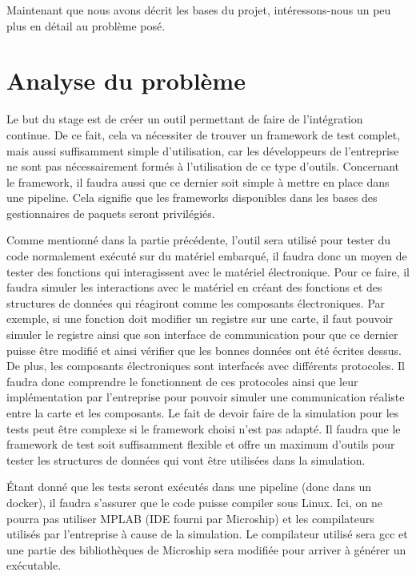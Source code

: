 \documentclass[a4paper]{article}
\begin{document}
Maintenant que nous avons décrit les bases du projet, intéressons-nous un peu
plus en détail au problème posé.
\section{Analyse du problème}%
\label{analproblem}

Le but du stage est de créer un outil permettant de faire de l'intégration
continue. De ce fait, cela va nécessiter de trouver un framework de test complet,
mais aussi suffisamment simple d'utilisation, car les développeurs de
l'entreprise ne sont pas nécessairement formés à l'utilisation de ce type
d'outils. Concernant le framework, il faudra aussi que ce dernier soit simple à
mettre en place dans une pipeline. Cela signifie que les frameworks disponibles
dans les bases des gestionnaires de paquets seront privilégiés.

Comme mentionné dans la partie précédente, l'outil sera utilisé pour tester du
code normalement exécuté sur du matériel embarqué, il faudra donc un moyen de
tester des fonctions qui interagissent avec le matériel électronique. Pour ce
faire, il faudra simuler les interactions avec le matériel en créant des
fonctions et des structures de données qui réagiront comme les composants
électroniques. Par exemple, si une fonction doit modifier un registre sur une
carte, il faut pouvoir simuler le registre ainsi que son interface de
communication pour que ce dernier puisse être modifié et ainsi vérifier que les
bonnes données ont été écrites dessus. De plus, les composants électroniques
sont interfacés avec différents protocoles. Il faudra donc comprendre le
fonctionnent de ces protocoles ainsi que leur implémentation par l'entreprise
pour pouvoir simuler une communication réaliste entre la carte et les
composants. Le fait de devoir faire de la simulation pour les tests peut être
complexe si le framework choisi n'est pas adapté. Il faudra que le framework de
test soit suffisamment flexible et offre un maximum d'outils pour tester les
structures de données qui vont être utilisées dans la simulation.

Étant donné que les tests seront exécutés dans une pipeline (donc dans un
docker), il faudra s'assurer que le code puisse compiler sous Linux. Ici, on ne
pourra pas utiliser MPLAB (IDE fourni par Microship) et les compilateurs
utilisés par l'entreprise à cause de la simulation. Le compilateur utilisé sera
gcc et une partie des bibliothèques de Microship sera modifiée pour arriver à
générer un exécutable.
\end{document}
